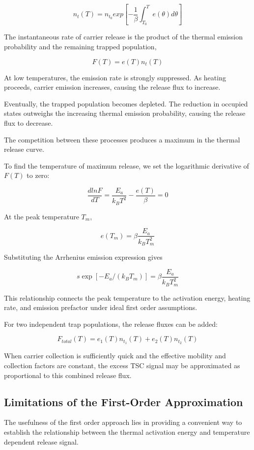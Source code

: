 \documentclass[letterpaper, 10pt, conference]{ieeeconf}
\begin{document}
$$ n_t(T) = n_{t_0} exp{[-\frac{1}{\beta} \int_{T_0}^T e(\theta)d\theta]} $$

The instantaneous rate of carrier release is the product of the thermal emission probability and the remaining trapped population,

$$ F(T) = e(T)n_t(T) $$

At low temperatures, the emission rate is strongly suppressed. As heating proceeds, carrier emission increases, causing the release flux to increase.

Eventually, the trapped population becomes depleted. The reduction in occupied states outweighs the increasing thermal emission probability, causing the release flux to decrease.

The competition between these processes produces a maximum in the thermal release curve.

To find the temperature of maximum release, we set the logarithmic derivative of $F(T)$ to zero:

$$ \frac{d ln F}{dT} = \frac{E_a}{k_B T^2} - \frac{e(T)}{\beta} = 0 $$

At the peak temperature $T_m$,

$$ e(T_m) = \beta \frac{E_a}{k_B T_m^2} $$

Substituting the Arrhenius emission expression gives

$$ s \exp[-E_a/(k_B T_m)] = \beta \frac{E_a}{k_B T_m^2} $$

This relationship connects the peak temperature to the activation energy, heating rate, and emission prefactor under ideal first order assumptions.

For two independent trap populations, the release fluxes can be added:

$$ F_{total}(T) = e_1(T)n_{t_1}(T) + e_2(T)n_{t_2}(T) $$

When carrier collection is sufficiently quick and the effective mobility and collection factors are constant, the excess TSC signal may be approximated as proportional to this combined release flux.

\subsection{Limitations of the First-Order Approximation}

The usefulness of the first order approach lies in providing a convenient way to establish the relationship between the thermal activation energy and temperature dependent release signal.
\end{document}

